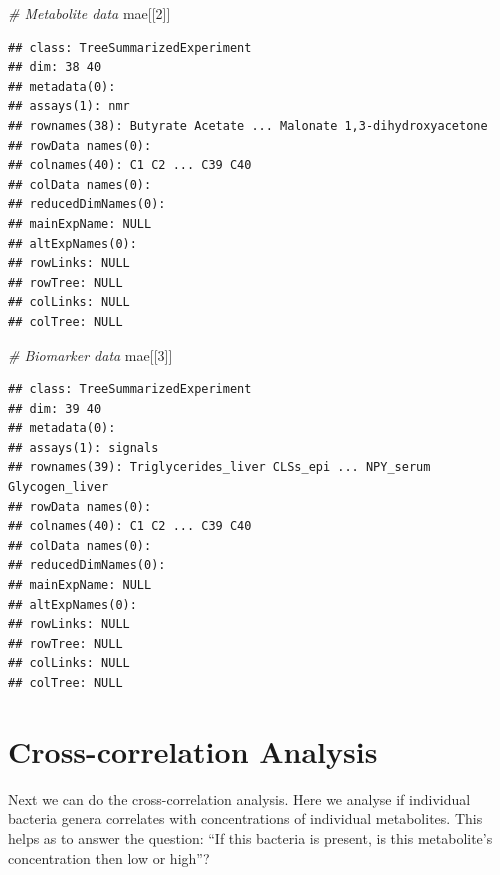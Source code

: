 \documentclass[
]{book}
\newenvironment{Shaded}{\begin{snugshade}}{\end{snugshade}}
\newcommand{\CommentTok}[1]{\textcolor[rgb]{0.56,0.35,0.01}{\textit{#1}}}
\newcommand{\DecValTok}[1]{\textcolor[rgb]{0.00,0.00,0.81}{#1}}
\newcommand{\NormalTok}[1]{#1}
\begin{document}
\begin{Shaded}
\begin{Highlighting}[]
\CommentTok{\# Metabolite data}
\NormalTok{mae[[}\DecValTok{2}\NormalTok{]]}
\end{Highlighting}
\end{Shaded}

\begin{verbatim}
## class: TreeSummarizedExperiment 
## dim: 38 40 
## metadata(0):
## assays(1): nmr
## rownames(38): Butyrate Acetate ... Malonate 1,3-dihydroxyacetone
## rowData names(0):
## colnames(40): C1 C2 ... C39 C40
## colData names(0):
## reducedDimNames(0):
## mainExpName: NULL
## altExpNames(0):
## rowLinks: NULL
## rowTree: NULL
## colLinks: NULL
## colTree: NULL
\end{verbatim}

\begin{Shaded}
\begin{Highlighting}[]
\CommentTok{\# Biomarker data}
\NormalTok{mae[[}\DecValTok{3}\NormalTok{]]}
\end{Highlighting}
\end{Shaded}

\begin{verbatim}
## class: TreeSummarizedExperiment 
## dim: 39 40 
## metadata(0):
## assays(1): signals
## rownames(39): Triglycerides_liver CLSs_epi ... NPY_serum Glycogen_liver
## rowData names(0):
## colnames(40): C1 C2 ... C39 C40
## colData names(0):
## reducedDimNames(0):
## mainExpName: NULL
## altExpNames(0):
## rowLinks: NULL
## rowTree: NULL
## colLinks: NULL
## colTree: NULL
\end{verbatim}

\hypertarget{cross-correlation-analysis}{%
\section{Cross-correlation Analysis}\label{cross-correlation-analysis}}

Next we can do the cross-correlation analysis.
Here we analyse if individual bacteria genera correlates
with concentrations of individual metabolites. This helps as to answer the question:
``If this bacteria is present, is this metabolite's concentration then low or high''?
\end{document}
